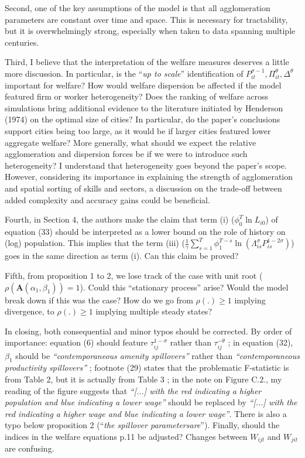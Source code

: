 \documentclass[12pt, final]{article}
\begin{document}
Second, one of the key assumptions of the model is that all agglomeration parameters are constant over time and space. This is necessary for tractability, but it is overwhelmingly strong, especially when taken to data spanning multiple centuries.

Third, I believe that the interpretation of the welfare measures deserves a little more discussion. In particular, is the ``\textit{up to scale}'' identification of $P_{it}^{\sigma-1}, \Pi_{it}^{\theta}, \Delta^{\theta}$ important for welfare? How would welfare dispersion be affected if the model featured firm or worker heterogeneity? 
Does the ranking of welfare across simulations bring additional evidence to the literature initiated by Henderson (1974) on the optimal size of cities?  In particular, do the paper's conclusions support cities being too large, as it would be if larger cities featured lower aggregate welfare?
More generally, what should we expect the relative agglomeration and dispersion forces be if we were to introduce such heterogeneity? 
I understand that heterogeneity goes beyond the paper’s scope. However, considering its importance in explaining the strength of agglomeration and spatial sorting of skills and sectors, a discussion on the trade-off between added complexity and accuracy gains could be beneficial. 

Fourth, in Section 4, the authors make the claim that term (i) ($\phi_0^T \ln L_{i0}$) of equation (33) should be interpreted as a lower bound on the role of history on (log) population. This implies that the term (iii) ($\frac{1}{\gamma}\sum_{s=1}^T \phi_1^{T-s} \ln(\Lambda_{is}^\sigma P_{is}^{1-2\sigma})$) goes in the same direction as term (i). Can this claim be proved?

Fifth, from proposition 1 to 2, we lose track of the case with unit root ($\rho(\mathbf{A}(\alpha_1, \beta_1)) = 1$). Could this ``stationary process'' arise? Would the model break down if this was the case? How do we go from $\rho(.) \geq 1$ implying divergence, to $\rho(.) \geq 1$ implying multiple steady states?

In closing, both consequential and minor typos should be corrected. By order of importance: equation (6) should feature $\tau_{ij}^{1 - \sigma}$ rather than $\tau_{ij}^{-\theta}$ ; in equation (32), $\beta_1$ should be \textit{``contemporaneous amenity spillovers''} rather than \textit{``contemporaneous productivity spillovers''} ; footnote (29) states that the problematic F-statistic is from Table 2, but it is actually from Table 3 ; in the note on Figure C.2., my reading of the figure suggests that \textit{``[...] with the red indicating a higher population and blue indicating a lower wage''} should be replaced by \textit{``[...] with the red indicating a higher wage and blue indicating a lower wage''}. There is also a typo below proposition 2 (``\textit{the spillover parametersare}'').
Finally, should the indices in the welfare equations p.11 be adjusted? Changes between $W_{ijt}$ and $W_{jit}$ are confusing. 
\end{document}
